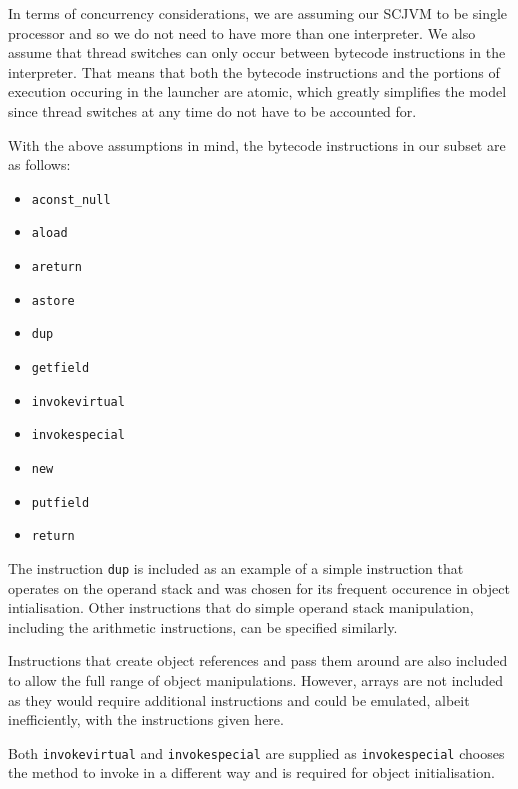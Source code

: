 \documentclass[a4paper,10pt]{report}
\begin{document}
In terms of concurrency considerations, we are assuming our SCJVM to
be single processor and so we do not need to have more than one
interpreter.
We also assume that thread switches can only occur between bytecode
instructions in the interpreter.
That means that both the bytecode instructions and the portions of
execution occuring in the launcher are atomic, which greatly
simplifies the model since thread switches at any time do not have to
be accounted for. 

With the above assumptions in mind, the bytecode instructions in our
subset are as follows:
\begin{itemize}
\item \texttt{aconst\_null}
\item \texttt{aload}
\item \texttt{areturn}
\item \texttt{astore}
\item \texttt{dup}
\item \texttt{getfield}
\item \texttt{invokevirtual}
\item \texttt{invokespecial}
\item \texttt{new}
\item \texttt{putfield}
\item \texttt{return}
\end{itemize}

The instruction \texttt{dup} is included as an example of a simple
instruction that operates on the operand stack and was chosen for its
frequent occurence in object intialisation.
Other instructions that do simple operand stack manipulation,
including the arithmetic instructions, can be specified similarly.

Instructions that create object references and pass them around are
also included to allow the full range of object manipulations.
However, arrays are not included as they would require additional
instructions and could be emulated, albeit inefficiently, with the
instructions given here.

Both \texttt{invokevirtual} and \texttt{invokespecial} are supplied as
\texttt{invokespecial} chooses the method to invoke in a different way
and is required for object initialisation.






\end{document}

